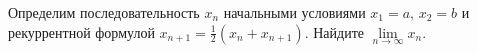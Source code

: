 \documentclass{article}
\begin{document}
Определим последовательность $x_n$ начальными условиями $x_1=a$, $x_2=b$ и рекуррентной формулой $x_{n+1} = \frac12 (x_n + x_{n+1})$. 
Найдите $\lim\limits_{n\to \infty} x_n$.
\end{document}
